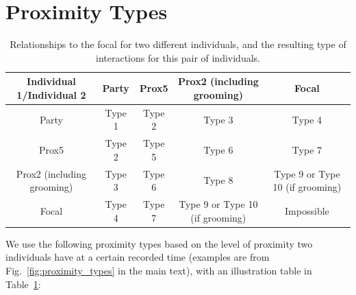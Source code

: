 \documentclass{article}
\theoremstyle{plain}
\theoremstyle{definition}
\theoremstyle{remark}
\begin{document}
\section{Proximity Types}
\label{app_sec:proximity_types}
\begin{table}[h]
    \centering
    \begin{tabular}{c|c|c|c|c}
    \toprule
        Individual 1/Individual 2 & Party&Prox5&Prox2 (including grooming)&Focal  \\
        \midrule
        Party &Type 1&Type 2&Type 3&Type 4\\
        \hline
        Prox5 &Type 2&Type 5&Type 6&Type 7\\ 
        \hline
        Prox2 (including grooming) &Type 3&Type 6&Type 8&Type 9 or Type 10 (if grooming)\\
        \hline
        Focal &Type 4&Type 7&Type 9 or Type 10 (if grooming)&Impossible\\ 
        \bottomrule
    \end{tabular}
    \caption{Relationships to the focal for two different individuals, and the resulting type of interactions for this pair of individuals.}
    \label{tab:proximity_types}
\end{table}
We use the following proximity types based on the level of proximity two individuals have at a certain recorded time (examples are from Fig.~\ref{fig:proximity_types} in the main text), with an illustration table in Table~\ref{tab:proximity_types}:
\end{document}
